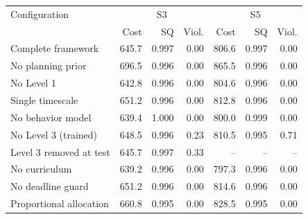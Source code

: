 \begin{tabular}{@{}lrrrrrr@{}}
\toprule
Configuration & \multicolumn{3}{c}{S3} & \multicolumn{3}{c}{S5} \\
 & Cost & SQ & Viol. & Cost & SQ & Viol. \\
\midrule
Complete framework & 645.7 & 0.997 & 0.00 & 806.6 & 0.997 & 0.00 \\
No planning prior & 696.5 & 0.996 & 0.00 & 865.5 & 0.996 & 0.00 \\
No Level 1 & 642.8 & 0.996 & 0.00 & 804.6 & 0.996 & 0.00 \\
Single timescale & 651.2 & 0.996 & 0.00 & 812.8 & 0.996 & 0.00 \\
No behavior model & 639.4 & 1.000 & 0.00 & 800.0 & 0.999 & 0.00 \\
No Level 3 (trained) & 648.5 & 0.996 & 0.23 & 810.5 & 0.995 & 0.71 \\
Level 3 removed at test & 645.7 & 0.997 & 0.33 & -- & -- & -- \\
No curriculum & 639.2 & 0.996 & 0.00 & 797.3 & 0.996 & 0.00 \\
No deadline guard & 651.2 & 0.996 & 0.00 & 814.6 & 0.996 & 0.00 \\
Proportional allocation & 660.8 & 0.995 & 0.00 & 828.5 & 0.995 & 0.00 \\
\bottomrule
\end{tabular}
